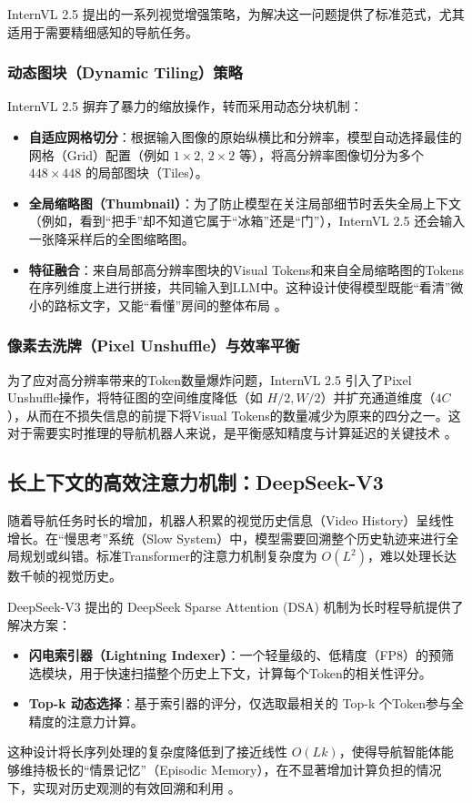 InternVL 2.5 \cite{internvl2_5} 提出的一系列视觉增强策略，为解决这一问题提供了标准范式，尤其适用于需要精细感知的导航任务。

\subsubsection{动态图块（Dynamic Tiling）策略}
InternVL 2.5 摒弃了暴力的缩放操作，转而采用动态分块机制：
\begin{itemize}
    \item \textbf{自适应网格切分}：根据输入图像的原始纵横比和分辨率，模型自动选择最佳的网格（Grid）配置（例如 $1\times 2$, $2\times 2$ 等），将高分辨率图像切分为多个 $448 \times 448$ 的局部图块（Tiles）。
    \item \textbf{全局缩略图（Thumbnail）}：为了防止模型在关注局部细节时丢失全局上下文（例如，看到“把手”却不知道它属于“冰箱”还是“门”），InternVL 2.5 还会输入一张降采样后的全图缩略图。
    \item \textbf{特征融合}：来自局部高分辨率图块的Visual Tokens和来自全局缩略图的Tokens在序列维度上进行拼接，共同输入到LLM中。这种设计使得模型既能“看清”微小的路标文字，又能“看懂”房间的整体布局 \cite{internvl2_5}。
\end{itemize}

\subsubsection{像素去洗牌（Pixel Unshuffle）与效率平衡}
为了应对高分辨率带来的Token数量爆炸问题，InternVL 2.5 引入了Pixel Unshuffle操作，将特征图的空间维度降低（如 $H/2, W/2$）并扩充通道维度（$4C$），从而在不损失信息的前提下将Visual Tokens的数量减少为原来的四分之一。这对于需要实时推理的导航机器人来说，是平衡感知精度与计算延迟的关键技术  。

\subsection{长上下文的高效注意力机制：DeepSeek-V3}
随着导航任务时长的增加，机器人积累的视觉历史信息（Video History）呈线性增长。在“慢思考”系统（Slow System）中，模型需要回溯整个历史轨迹来进行全局规划或纠错。标准Transformer的注意力机制复杂度为 $O(L^2)$，难以处理长达数千帧的视觉历史。

DeepSeek-V3 \cite{deepseek_v3} 提出的 DeepSeek Sparse Attention (DSA) 机制为长时程导航提供了解决方案：
\begin{itemize}
    \item \textbf{闪电索引器（Lightning Indexer）}：一个轻量级的、低精度（FP8）的预筛选模块，用于快速扫描整个历史上下文，计算每个Token的相关性评分。
    \item \textbf{Top-k 动态选择}：基于索引器的评分，仅选取最相关的 Top-k 个Token参与全精度的注意力计算。
\end{itemize}
这种设计将长序列处理的复杂度降低到了接近线性 $O(Lk)$，使得导航智能体能够维持极长的“情景记忆”（Episodic Memory），在不显著增加计算负担的情况下，实现对历史观测的有效回溯和利用 \cite{deepseek_v3_analysis}。


